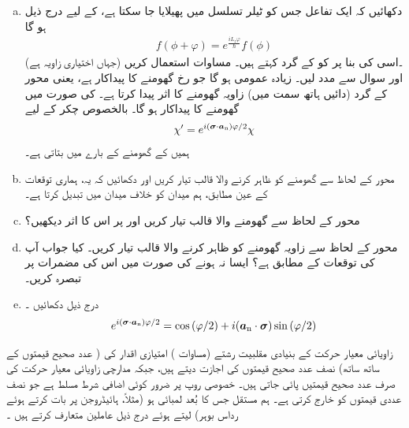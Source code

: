 \begin{enumerate}[a.]
\item
  دکھائیں کہ ایک تفاعل  جس کو ٹیلر تسلسل میں پھیلایا جا سکتا ہے، کے لیے درج ذیل ہو گا 
\begin{align*}
    f(\phi+\varphi)= e^{\frac{i L_z\varphi}{\hslash}}f(\phi)
\end{align*} 
(جہاں  اختیاری زاویہ ہے) ۔اسی کی بنا پر  کو  کے گرد  کہتے ہیں۔  مساوات  استعمال کریں اور سوال  سے مدد لیں۔ زیادہ عمومی  ہو گا جو  رخ گھومنے کا پیداکار ہے، 
 یعنی  محور    کے گرد  (دائیں ہاتھ   سمت میں)      زاویہ   گھومنے کا اثر پیدا کرتا ہے۔   کی صورت میں گھومنے کا پیداکار   ہو گا۔ بالخصوص   چکر کے لیے
\begin{align}
    \chi'=e^{i({{\boldsymbol{\sigma}}}\cdot {\ensuremath{{\boldsymbol{a}}}_{\textup{n}}})\varphi/2}\chi
\end{align}
 ہمیں   کے گھومنے کے بارے میں بتاتی ہے۔ 
\item
 محور  کے لحاظ سے   گھومنے کو ظاہر کرنے والا  قالب تیار کریں اور دکھائیں کہ یہ،  ہماری توقعات کے عین مطابق،  ہم میدان  کو خلاف میدان  میں تبدیل کرتا ہے۔ 
\item
 محور  کے لحاظ سے گھومنے والا قالب تیار کریں اور   پر اس کا اثر دیکھیں؟ 
\item
 محور  کے لحاظ سے  زاویہ گھومنے کو ظاہر کرنے والا قالب تیار کریں۔ کیا جواب آپ کی توقعات کے مطابق ہے؟ ایسا نہ ہونے کی صورت میں اس کی مضمرات پر تبصرہ کریں۔
\item
 درج ذیل دکھائیں ۔
\begin{align} e^{i({{\boldsymbol{\sigma}}}\cdot {\ensuremath{{\boldsymbol{a}}}_{\textup{n}}})\varphi/2}=\cos{(\varphi/2)}+i({{\boldsymbol{a}}_{\textup{n}}}\cdot {\ensuremath{{\boldsymbol{\sigma}}}})\sin{(\varphi/2)}
\end{align}
\end{enumerate}
زاویائی معیار حرکت کے بنیادی  مقلبیت  رشتے (مساوات ) امتیازی اقدار کی ( عدد صحیح قیمتوں کے ساتھ ساتھ)  نصف عدد صحیح قیمتوں کی   اجازت دیتے ہیں،  جبکہ مدارچی زاویائی معیار حرکت کی صرف عدد صحیح قیمتیں پائی جاتی ہیں۔ خصوصی روپ   پر ضرور کوئی اضافی شرط مسلط ہے جو  نصف عددی قیمتوں کو خارج کرتی ہے۔ ہم مستقل     جس کا بُعد    لمبائی ہو  (مثلاً،  ہائیڈروجن پر بات کرتے ہوئے رداس بوہر)  لیتے ہوئے  درج ذیل عاملین متعارف کرتے ہیں ۔
